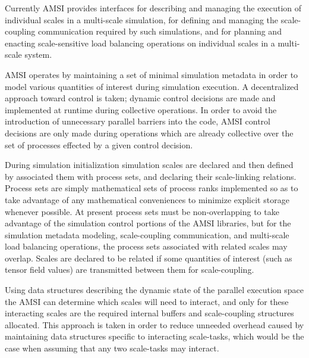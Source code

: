 Currently AMSI provides interfaces for describing and managing the execution of individual scales in a multi-scale simulation, for defining and managing the scale-coupling communication required by such simulations, and for planning and enacting scale-sensitive load balancing operations on individual scales in a multi-scale system.

AMSI operates by maintaining a set of minimal simulation metadata in order to model various quantities of interest during simulation execution. A decentralized approach toward control is taken; dynamic control decisions are made and implemented at runtime during collective operations. In order to avoid the introduction of unnecessary parallel barriers into the code, AMSI control decisions are only made during operations which are already collective over the set of processes effected by a given control decision.

\label{amsi-scales}
During simulation initialization simulation scales are declared and then defined by associated them with process sets, and declaring their scale-linking relations. Process sets are simply mathematical sets of process ranks implemented so as to take advantage of any mathematical conveniences to minimize explicit storage whenever possible. At present process sets must be non-overlapping to take advantage of the simulation control portions of the AMSI libraries, but for the simulation metadata modeling, scale-coupling communication, and multi-scale load balancing operations, the process sets associated with related scales may overlap. Scales are declared to be related if some quantities of interest (such as tensor field values) are transmitted between them for scale-coupling.

\label{amsi-communication}
Using data structures describing the dynamic state of the parallel execution space the AMSI can determine which scales will need to interact, and only for these interacting scales are the required internal buffers and scale-coupling structures allocated. This approach is taken in order to reduce unneeded overhead caused by maintaining data structures specific to interacting scale-tasks, which would be the case when assuming that any two scale-tasks may interact.

